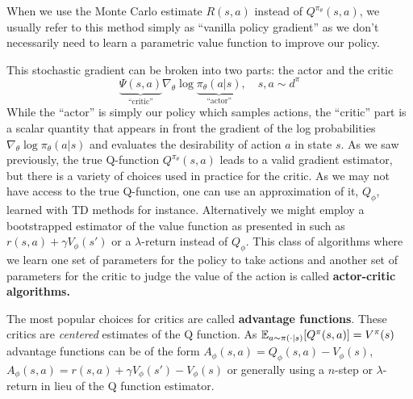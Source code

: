 When we use the Monte Carlo estimate $R(s, a)$ instead of $Q^{\pi_\theta}(s,a)$, we usually refer to this method simply as ``vanilla policy gradient'' as we don't necessarily need to learn a parametric value function to improve our policy. 

This stochastic gradient can be broken into two parts: the actor and the critic $$\underbrace{\Psi(s,a)}_{\text{``critic''}} \nabla_\theta \log \underbrace{\pi_\theta(a|s)}_{\text{``actor''}}, \quad s,a \sim d^\pi$$
While the ``actor'' is simply our policy which samples actions, the ``critic'' part is a scalar quantity that appears in front the gradient of the log probabilities $\nabla_\theta \log \pi_\theta(a|s)$ and evaluates the desirability of action $a$ in state $s$. As we saw previously, the true Q-function $ Q^{\pi_\theta}(s,a)$ leads to a valid gradient estimator, but there is a variety of choices used in practice for the critic. As we may not have access to the true Q-function, one can use an approximation of it, $Q_\phi$, learned with TD methods for instance.
Alternatively we might employ a bootstrapped estimator of the value function as presented in  such as $r(s,a) + \gamma V_\phi(s')$ or a $\lambda$-return instead of $Q_\phi$. 
This class of algorithms where we learn one set of parameters for the policy to take actions and another set of parameters for the critic to judge the value of the action is called \textbf{actor-critic algorithms.} 

The most popular choices for critics are called \textbf{advantage functions}. These critics are \emph{centered} estimates of the Q function. As $\mathbb{E}_{a\sim\pi(\cdot|s)} [Q^\pi(s,a)] = V^\pi(s)$ advantage functions can be of the form $A_\phi(s,a) = Q_\phi(s,a) - V_\phi(s)$, $A_\phi(s,a) =  r(s,a) + \gamma V_\phi(s') - V_\phi(s)$ or generally using a $n$-step or $\lambda$-return in lieu of the Q function estimator. 

